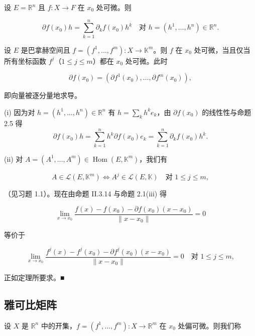 \begin{theorem}

\begin{subitems}
\item

设 $ E = \mathbb{R}^n $ 且 $ f : X \to F $ 在 $ x_0 $ 处可微。则

\[
\partial f(x_0)h = \sum_{k=1}^{n} \partial_k f(x_0) h^k \quad \text{对 } h = (h^1, \ldots, h^n) \in \mathbb{R}^n .
\]
\item

设 $ E $ 是巴拿赫空间且 $ f = (f^1, \ldots, f^m) : X \to \mathbb{K}^m $。则 $ f $ 在 $ x_0 $ 处可微，当且仅当所有坐标函数 $ f^j $（$ 1 \le j \le m $）都在 $ x_0 $ 处可微。此时

\[
\partial f(x_0) = (\partial f^1(x_0), \ldots, \partial f^m(x_0)) ,
\]

即向量被逐分量地求导。

\proofhead
(i) 因为对 $ h = (h^1, \ldots, h^n) \in \mathbb{R}^n $ 有 $ h = \sum_k h^k e_k $，由 $ \partial f(x_0) $ 的线性性与命题 2.5 得
\[
\partial f(x_0)h = \sum_{k=1}^{n} h^k \partial f(x_0)e_k = \sum_{k=1}^{n} \partial_k f(x_0) h^k .
\]
\end{subitems}

(ii) 对 $ A = (A^1, \ldots, A^m) \in \operatorname{Hom}(E, \mathbb{K}^m) $，我们有

\[
A \in \mathcal{L}(E, \mathbb{K}^m) \iff A^j \in \mathcal{L}(E, \mathbb{K}) \quad \text{对 } 1 \le j \le m ,
\]

（见习题 1.1）。现在由命题 II.3.14 与命题 2.1(iii) 得

\[
\lim_{x \to x_0} \frac{f(x) - f(x_0) - \partial f(x_0)(x - x_0)}{\|x - x_0\|} = 0
\]

等价于

\[
\lim_{x \to x_0} \frac{f^j(x) - f^j(x_0) - \partial f^j(x_0)(x - x_0)}{\|x - x_0\|} = 0 \quad \text{对 } 1 \le j \le m ,
\]

正如定理所要求。\nobreak\hspace{0.35em}■

\end{theorem}

\subsection*{雅可比矩阵}

设 $ X $ 是 $ \mathbb{R}^n $ 中的开集，$ f = (f^1, \ldots, f^m) : X \to \mathbb{R}^m $ 在 $ x_0 $ 处偏可微。则我们称

